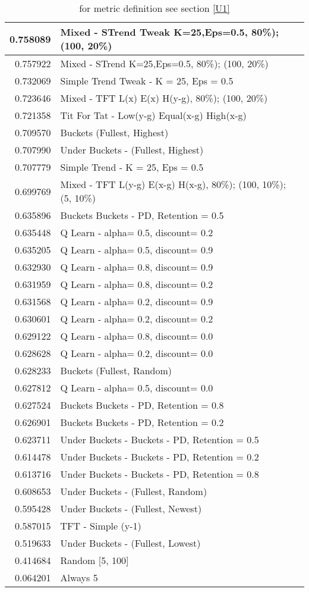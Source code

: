 \begin{table}[!hbtp]
\begin{footnotesize}
\begin{tabular}{|r|l|}
0.758089 & Mixed - {STrend Tweak K=25,Eps=0.5, 80\%); (100, 20\%)}\\ \hline
0.757922 & Mixed - {STrend K=25,Eps=0.5, 80\%); (100, 20\%)}\\ \hline
0.732069 & Simple Trend Tweak - K = 25, Eps = 0.5\\ \hline
0.723646 & Mixed - {TFT L(x) E(x) H(y-g), 80\%); (100, 20\%)}\\ \hline
0.721358 & Tit For Tat - Low(y-g) Equal(x-g) High(x-g)\\ \hline
0.709570 & Buckets (Fullest, Highest)\\ \hline
0.707990 & Under Buckets - (Fullest, Highest)\\ \hline
0.707779 & Simple Trend - K = 25, Eps = 0.5\\ \hline
0.699769 & Mixed - {TFT L(y-g) E(x-g) H(x-g), 80\%); (100, 10\%); (5, 10\%)}\\ \hline
0.635896 & Buckets Buckets - PD, Retention = 0.5\\ \hline
0.635448 & Q Learn - alpha= 0.5, discount= 0.2\\ \hline
0.635205 & Q Learn - alpha= 0.5, discount= 0.9\\ \hline
0.632930 & Q Learn - alpha= 0.8, discount= 0.9\\ \hline
0.631959 & Q Learn - alpha= 0.8, discount= 0.2\\ \hline
0.631568 & Q Learn - alpha= 0.2, discount= 0.9\\ \hline
0.630601 & Q Learn - alpha= 0.2, discount= 0.2\\ \hline
0.629122 & Q Learn - alpha= 0.8, discount= 0.0\\ \hline
0.628628 & Q Learn - alpha= 0.2, discount= 0.0\\ \hline
0.628233 & Buckets (Fullest, Random)\\ \hline
0.627812 & Q Learn - alpha= 0.5, discount= 0.0\\ \hline
0.627524 & Buckets Buckets - PD, Retention = 0.8\\ \hline
0.626901 & Buckets Buckets - PD, Retention = 0.2\\ \hline
0.623711 & Under Buckets - Buckets - PD, Retention = 0.5\\ \hline
0.614478 & Under Buckets - Buckets - PD, Retention = 0.2\\ \hline
0.613716 & Under Buckets - Buckets - PD, Retention = 0.8\\ \hline
0.608653 & Under Buckets - (Fullest, Random)\\ \hline
0.595428 & Under Buckets - (Fullest, Newest)\\ \hline
0.587015 & TFT - Simple (y-1)\\ \hline
0.519633 & Under Buckets - (Fullest, Lowest)\\ \hline
0.414684 & Random [5, 100]\\ \hline
0.064201 & Always 5\\ \hline
\end{tabular}
\caption{for metric definition see section \eqref{U1}}
\end{footnotesize}
\end{table}

